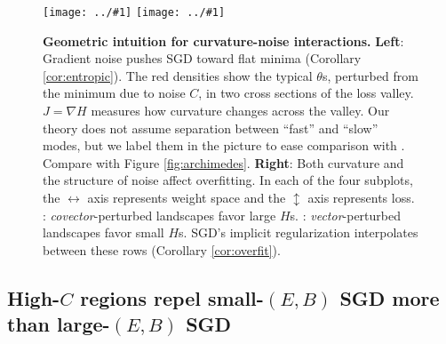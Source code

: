 \documentclass{article}
\newcommand{\offive}[1]{
    {\tiny
        \raisebox{-0.04cm}{\color{gray}\scalebox{2.5}{$\substack{
            \ifthenelse{\equal{#1}{0}}{{\color{moor}\blacksquare}}{\square} 
        }$}}%
        \raisebox{0.04cm}{$\substack{
            \IfSubStr{#1}{1}{{\color{moor}\blacksquare}}{\square}   
            \IfSubStr{#1}{1}{{\color{moor}\blacksquare}}{\square} \\
            \IfSubStr{#1}{2}{{\color{moor}\blacksquare}}{\square}    
            \IfSubStr{#1}{2}{{\color{moor}\blacksquare}}{\square}    
        }$}%
    }%
}
\theoremstyle{plain}
\theoremstyle{definition}
\newcommand{\plotmooh}[3]{\texttt{[image: ../\#1]}}
\begin{document}
            \begin{figure}[h!]
                \centering
                \plotmooh{diagrams/entropic-force-diagram}{}{0.32\columnwidth} 
                \plotmooh{diagrams/sharp}{}{0.31\columnwidth}
                \caption{%
                    \textbf{Geometric intuition for curvature-noise interactions.}
                    \textbf{Left}:
                        Gradient noise pushes SGD toward flat minima
                        (Corollary
                        \ref{cor:entropic}).  The red densities show the 
                        typical $\theta$s, perturbed from the
                        minimum due to noise $C$, in two cross sections of the
                        loss valley.  $J = \nabla H$ measures
                        how curvature changes across the valley.  Our theory
                        does not assume separation between ``fast'' and
                        ``slow'' modes, but we label them in the picture to
                        ease comparison with \cite{we19b}.
                        Compare with Figure \ref{fig:archimedes}.
                    \textbf{\bf Right}:
                        Both curvature and the structure of noise affect
                        overfitting.  In each of the four subplots, the  
                        $\leftrightarrow$ axis represents weight space and the
                        $\updownarrow$ axis represents loss.
                        \protect\offive{1}:
                        \emph{covector}-perturbed landscapes favor large $H$s.
                        \protect\offive{2}:
                        \emph{vector}-perturbed landscapes favor small $H$s.
                        SGD's implicit regularization interpolates between
                        these rows (Corollary \ref{cor:overfit}).
                }
                \label{fig:cubicandspring}
            \end{figure}
    
        \subsection{High-$C$ regions repel small-$(E,B)$ SGD more than large-$(E,B)$ SGD}
            \label{subsect:epochs-batch}
\end{document}
